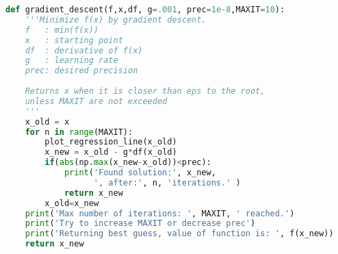 \documentclass[graybox,sectrefs,envcountresetchap,open=right,final]{svmonodo}
\newenvironment{doconceexercise}{}{}
\begin{document}
\begin{doconceexercise}
\begin{lstlisting}[language=python,style=blue1]
def gradient_descent(f,x,df, g=.001, prec=1e-8,MAXIT=10):
    '''Minimize f(x) by gradient descent.
    f   : min(f(x))
    x   : starting point 
    df  : derivative of f(x)
    g   : learning rate
    prec: desired precision
    
    Returns x when it is closer than eps to the root, 
    unless MAXIT are not exceeded
    '''
    x_old = x
    for n in range(MAXIT):
        plot_regression_line(x_old)  
        x_new = x_old - g*df(x_old)
        if(abs(np.max(x_new-x_old))<prec):
            print('Found solution:', x_new, 
                  ', after:', n, 'iterations.' )
            return x_new
        x_old=x_new
    print('Max number of iterations: ', MAXIT, ' reached.') 
    print('Try to increase MAXIT or decrease prec')
    print('Returning best guess, value of function is: ', f(x_new))
    return x_new

\end{lstlisting}



\end{doconceexercise}
\end{document}
